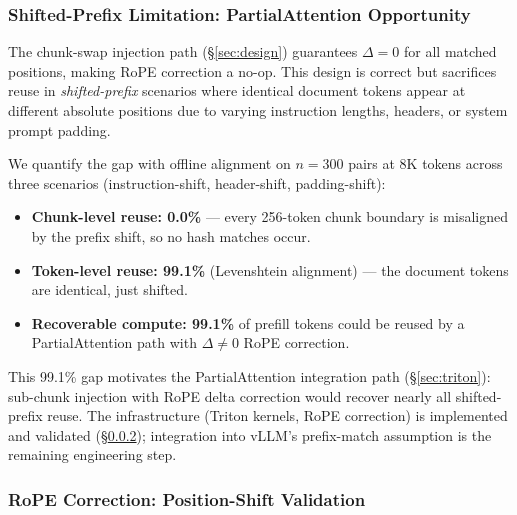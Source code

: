 \documentclass[10pt,twocolumn]{article}
\begin{document}
\subsubsection{Shifted-Prefix Limitation: PartialAttention Opportunity}
\label{sec:analysis:partial-attn-gap}

The chunk-swap injection path (\S\ref{sec:design}) guarantees $\Delta{=}0$
for all matched positions, making RoPE correction a no-op. This design is
correct but sacrifices reuse in \emph{shifted-prefix} scenarios where
identical document tokens appear at different absolute positions due to
varying instruction lengths, headers, or system prompt padding.

We quantify the gap with offline alignment on $n{=}300$ pairs at 8K tokens
across three scenarios (instruction-shift, header-shift, padding-shift):

\begin{itemize}[nosep]
\item \textbf{Chunk-level reuse: 0.0\%} --- every 256-token chunk boundary
  is misaligned by the prefix shift, so no hash matches occur.
\item \textbf{Token-level reuse: 99.1\%} (Levenshtein alignment) --- the
  document tokens are identical, just shifted.
\item \textbf{Recoverable compute: 99.1\%} of prefill tokens could be
  reused by a PartialAttention path with $\Delta{\neq}0$ RoPE correction.
\end{itemize}

This 99.1\% gap motivates the PartialAttention integration path
(\S\ref{sec:triton}): sub-chunk injection with RoPE delta correction
would recover nearly all shifted-prefix reuse. The infrastructure
(Triton kernels, RoPE correction) is implemented and validated
(\S\ref{sec:analysis:rope}); integration into vLLM's prefix-match
assumption is the remaining engineering step.

\subsubsection{RoPE Correction: Position-Shift Validation}
\label{sec:analysis:rope}
\end{document}
